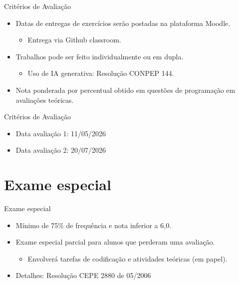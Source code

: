 \begin{frame}{Critérios de Avaliação}

    \begin{itemize}

        \item
        Datas de entregas de exercícios serão postadas na plataforma Moodle.

        \begin{itemize}

            \item
            Entrega via Github classroom.
        \end{itemize}
        \item
        Trabalhos pode ser feito individualmente ou em dupla.

        \begin{itemize}

            \item
            Uso de IA generativa: Resolução CONPEP 144.
        \end{itemize}
        \item
        Nota ponderada por percentual obtido em questões de programação em
        avaliações teóricas.
    \end{itemize}
\end{frame}

\begin{frame}{Critérios de Avaliação}

    \begin{itemize}

        \item
        Data avaliação 1: 11/05/2026
        \item
        Data avaliação 2: 20/07/2026
    \end{itemize}
\end{frame}


\section{Exame especial}\label{exame-especial}

\begin{frame}{Exame especial}

    \begin{itemize}
        \item
        Mínimo de 75\% de frequência e nota inferior a 6,0.
        \item
        Exame especial parcial para alunos que perderam uma avaliação.

        \begin{itemize}

            \item
            Envolverá tarefas de codificação e atividades teóricas (em papel).
        \end{itemize}
        \item
        Detalhes: Resolução CEPE 2880 de 05/2006
    \end{itemize}
\end{frame}

